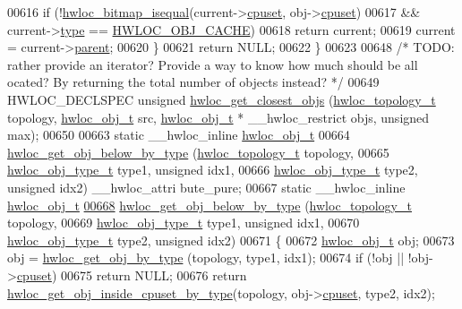\begin{DoxyCode}
{{00616     \textcolor{keywordflow}{if} (!\hyperlink{a00065_ga4dd6a75ab63d33ef33bd626b0e489388}{hwloc_bitmap_isequal}(current->\hyperlink{a00016_a67925e0f2c47f50408fbdb9bddd0790f}{cpuset}, obj->\hyperlink{a00016_a67925e0f2c47f50408fbdb9bddd0790f}{cpuset})
00617         && current->\hyperlink{a00016_acc4f0803f244867e68fe0036800be5de}{type} == \hyperlink{a00041_ggacd37bb612667dc437d66bfb175a8dc55a56ee0b7eca88f363b75b34fdde8c9ddc}{HWLOC_OBJ_CACHE})
00618       \textcolor{keywordflow}{return} current;
00619     current = current->\hyperlink{a00016_adc494f6aed939992be1c55cca5822900}{parent};
00620   \}
00621   \textcolor{keywordflow}{return} NULL;
00622 \}
00623 
00648 \textcolor{comment}{/* TODO: rather provide an iterator? Provide a way to know how much should be all
      ocated? By returning the total number of objects instead? */}
00649 HWLOC\_DECLSPEC \textcolor{keywordtype}{unsigned} \hyperlink{a00058_ga26c2ac4f25b1ed293249c88e232f1bea}{hwloc_get_closest_objs} (\hyperlink{a00039_ga9d1e76ee15a7dee158b786c30b6a6e38}{hwloc_topology_t} topology, 
      \hyperlink{a00016}{hwloc_obj_t} src, \hyperlink{a00016}{hwloc_obj_t} * \_\_hwloc\_restrict objs, \textcolor{keywordtype}{unsigned} max);
00650 
00663 \textcolor{keyword}{static} \_\_hwloc\_inline \hyperlink{a00016}{hwloc_obj_t}
00664 \hyperlink{a00058_ga6c482c2097f01b1ff88598fec8a1ba3b}{hwloc_get_obj_below_by_type} (\hyperlink{a00039_ga9d1e76ee15a7dee158b786c30b6a6e38}{hwloc_topology_t} topology,
00665                              \hyperlink{a00041_gacd37bb612667dc437d66bfb175a8dc55}{hwloc_obj_type_t} type1, \textcolor{keywordtype}{unsigned} idx1,
00666                              \hyperlink{a00041_gacd37bb612667dc437d66bfb175a8dc55}{hwloc_obj_type_t} type2, \textcolor{keywordtype}{unsigned} idx2) \_\_hwloc\_attri
      bute\_pure;
00667 \textcolor{keyword}{static} \_\_hwloc\_inline \hyperlink{a00016}{hwloc_obj_t}
\hypertarget{a00031_source_l00668}{}\hyperlink{a00058_ga6c482c2097f01b1ff88598fec8a1ba3b}{00668} \hyperlink{a00058_ga6c482c2097f01b1ff88598fec8a1ba3b}{hwloc_get_obj_below_by_type} (\hyperlink{a00039_ga9d1e76ee15a7dee158b786c30b6a6e38}{hwloc_topology_t} topology,
00669                              \hyperlink{a00041_gacd37bb612667dc437d66bfb175a8dc55}{hwloc_obj_type_t} type1, \textcolor{keywordtype}{unsigned} idx1,
00670                              \hyperlink{a00041_gacd37bb612667dc437d66bfb175a8dc55}{hwloc_obj_type_t} type2, \textcolor{keywordtype}{unsigned} idx2)
00671 \{
00672   \hyperlink{a00016}{hwloc_obj_t} obj;
00673   obj = \hyperlink{a00047_ga9be4a03488cdd0fb431e4aa1cbdea895}{hwloc_get_obj_by_type} (topology, type1, idx1);
00674   \textcolor{keywordflow}{if} (!obj || !obj->\hyperlink{a00016_a67925e0f2c47f50408fbdb9bddd0790f}{cpuset})
00675     \textcolor{keywordflow}{return} NULL;
00676   \textcolor{keywordflow}{return} \hyperlink{a00054_gaa8dcdb85224f7350b90fb0a1ca91e6d6}{hwloc_get_obj_inside_cpuset_by_type}(topology, obj->\hyperlink{a00016_a67925e0f2c47f50408fbdb9bddd0790f}{cpuset}, type2, idx2);
      
}}
\end{DoxyCode}
